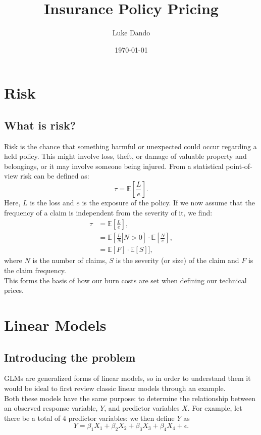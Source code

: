 \documentclass{article}
\title{Insurance Policy Pricing}
\author{Luke Dando}
\date{\today}
\begin{document}
\maketitle
\tableofcontents
\pagebreak
{}


\section{Risk}
\subsection{What is risk?}
Risk is the chance that something harmful or unexpected could occur regarding a held policy. This might involve loss, theft, or damage of valuable property and belongings, or it may involve someone being injured. From a statistical point-of-view risk can be defined as:
\begin{equation}
    \tau = \mathbb{E}\left[\frac{L}{e}\right].
\end{equation}
Here, $L$ is the loss and $e$ is the exposure of the policy. If we now assume that the frequency of a claim is independent from the severity of it, we find:
\begin{align}
    \tau &= \mathbb{E}\left[\frac{L}{e}\right], \\
    &= \mathbb{E}\left[\left.\frac{L}{N}\right\vert N>0\right]\cdot\mathbb{E}\left[\frac{N}{e}\right], \\
    &= \mathbb{E}[F]\cdot\mathbb{E}[S]],
\end{align}
where $N$ is the number of claims, $S$ is the severity (or size) of the claim and $F$ is the claim frequency.\\
This forms the basis of how our burn costs are set when defining our technical prices.

\section{Linear Models}
\subsection{Introducing the problem}
GLMs are generalized forms of linear models, so in order to understand them it would be ideal to first review classic linear models through an example. \\
Both these models have the same purpose: to determine the relationship between an observed response variable, $Y$, and predictor variables $X$. For example, let there be a total of $4$ predictor variables: we then define $Y$ as
\begin{equation}
    Y = \beta_1X_1 + \beta_2X_2 + \beta_3X_3 + \beta_4X_4 + \epsilon.
\end{equation}
\end{document}
